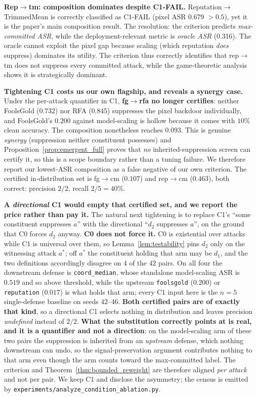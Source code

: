 \documentclass{article}
\begin{document}
\textbf{Rep$\to$tm: composition dominates despite C1-FAIL.} Reputation$\to$TrimmedMean is correctly classified as C1-FAIL (pixel ASR 0.679 $> 0.5$), yet it is the paper's main composition result. The resolution: the criterion predicts \emph{max-committed ASR}, while the deployment-relevant metric is \emph{oracle ASR} (0.316). The oracle cannot exploit the pixel gap because scaling (which reputation \emph{does} suppress) dominates its utility. The criterion thus correctly identifies that rep$\to$tm does not suppress every committed attack, while the game-theoretic analysis shows it is strategically dominant.

\textbf{Tightening C1 costs us our own flagship, and reveals a synergy case.} Under the per-attack quantifier in C1, \textbf{fg$\to$rfa no longer certifies}: neither FoolsGold ($0.732$) nor RFA ($0.845$) suppresses the pixel backdoor individually, and FoolsGold's $0.200$ against model-scaling is hollow because it comes with $10\%$ clean accuracy. The composition nonetheless reaches $0.093$. This is genuine \emph{synergy} (suppression neither constituent possesses) and Proposition~\ref{prop:emergent_full} proves that \emph{no} inherited-suppression screen can certify it, so this is a scope boundary rather than a tuning failure. We therefore report our lowest-ASR composition as a false negative of our own criterion. The certified in-distribution set is fg$\to$cm ($0.107$) and rep$\to$cm ($0.463$), both correct: precision $2/2$, recall $2/5 = 40\%$.

\textbf{A \emph{directional} C1 would empty that certified set, and we report the price rather than pay it.} The natural next tightening is to replace C1's ``some constituent suppresses $a$'' with the directional ``\emph{$d_2$} suppresses $a$'', on the ground that C0 forces $d_2$ anyway. \textbf{C0 does not force it.} C0 is existential over attacks while C1 is universal over them, so Lemma~\ref{lem:testability} pins $d_2$ only on the witnessing attack $a^*$; off $a^*$ the constituent holding that arm may be $d_1$, and the two definitions accordingly disagree on $4$ of the $42$ pairs. On all four the downstream defense is \texttt{coord\_median}, whose standalone model-scaling ASR is $0.519$ and so above threshold, while the upstream \texttt{foolsgold} ($0.200$) or \texttt{reputation} ($0.017$) is what holds that arm; every C1 input here is the $n{=}5$ single-defense baseline on seeds $42$--$46$. \textbf{Both certified pairs are of exactly that kind}, so a directional C1 selects nothing in distribution and leaves precision \emph{undefined} instead of $2/2$. \textbf{What the substitution correctly points at is real, and it is a quantifier and not a direction}: on the model-scaling arm of these two pairs the suppression is inherited from an \emph{upstream} defense, which nothing downstream can undo, so the signal-preservation argument contributes nothing to that arm even though the arm counts toward the max-committed label. The criterion and Theorem~\ref{thm:bounded_reweight} are therefore aligned \emph{per attack} and not per pair. We keep C1 and disclose the asymmetry; the census is emitted by \texttt{experiments/\allowbreak analyze\_condition\_ablation.py}.
\end{document}
